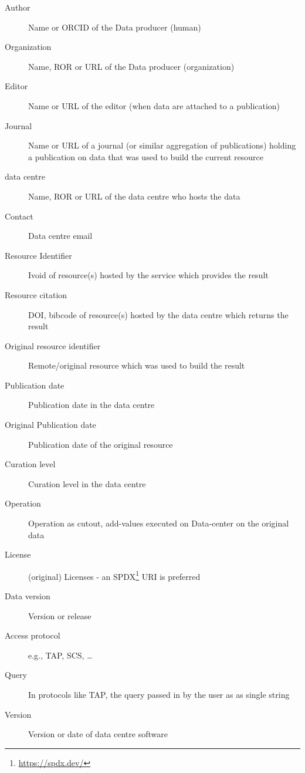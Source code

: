 \documentclass[11pt,a4paper]{ivoa}
\begin{document}
\begin{description}
\item [Author] Name or ORCID of the Data producer (human)
\item [Organization]  Name, ROR or URL of the Data producer (organization)
\item [Editor] Name or URL  of the editor (when data are attached to a publication)
\item [Journal] Name or URL of a journal (or similar aggregation of publications) holding a publication on data that was used to build the current resource
\item [data centre] Name, ROR or URL of the data centre who hosts the data
\item [Contact] Data centre email
\item [Resource Identifier] Ivoid of resource(s) hosted by the service which provides the result
\item [Resource citation] DOI, bibcode of resource(s) hosted by the data centre which returns the result
\item [Original resource identifier] Remote/original resource which was used to build the result
\item [Publication date] Publication date in the data centre
\item [Original Publication date]  Publication date of the original resource
\item [Curation level] Curation level in the data centre
\item [Operation] Operation as cutout, add-values executed on Data-center on the original data
\item [License] (original) Licenses - an SPDX\footnote{\url{https://spdx.dev/}}
URI is preferred
\item [Data version] Version or release
\item [Access protocol]  e.g., TAP, SCS, \dots{}
\item [Query] In protocols like TAP, the query passed in by the user as
as single string
\item [Version] Version or date of data centre software
\end{description}
\end{document}
